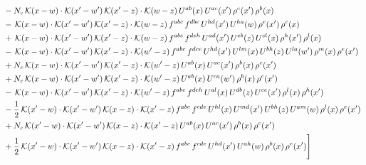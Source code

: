 \documentclass[9pt]{article}
\numberwithin{equation}{section}
\begin{document}
\begin{align}
& -N_{c}\,\mathcal{K}(x-w)\cdot\mathcal{K}(x'-w')\,\mathcal{K}(x'-z)\cdot\mathcal{K}(w-z)\,U^{ab}(x)\,U^{ac}(x')\,\rho^{c}(x')\,\rho^{b}(x)\notag\\
& -\,\mathcal{K}(x-w)\cdot\mathcal{K}(x'-w')\,\mathcal{K}(x'-z)\cdot\mathcal{K}(w-z)\,f^{abc}\,f^{dbe}\,U^{hd}(x')\,U^{ha}(w)\,\rho^{e}(x')\,\rho^{c}(x)\notag\\
& +\,\mathcal{K}(x-w)\cdot\mathcal{K}(x'-w')\,\mathcal{K}(x'-z)\cdot\mathcal{K}(w-z)\,f^{abc}\,f^{deh}\,U^{ad}(x')\,U^{eb}(z)\,U^{cl}(x)\,\rho^{h}(x')\,\rho^{l}(x)\notag\\
& -\,\mathcal{K}(x-w)\cdot\mathcal{K}(x'-w')\,\mathcal{K}(x'-z)\cdot\mathcal{K}(w'-z)\,f^{abc}\,f^{dce}\,U^{hd}(x')\,U^{lm}(x)\,U^{bh}(z)\,U^{la}(w')\,\rho^{m}(x)\,\rho^{e}(x')\notag\\
& +N_{c}\,\mathcal{K}(x-w)\cdot\mathcal{K}(x'-w')\,\mathcal{K}(x'-z)\cdot\mathcal{K}(w'-z)\,U^{ab}(x)\,U^{ac}(x')\,\rho^{b}(x)\,\rho^{c}(x')\notag\\
& +N_{c}\,\mathcal{K}(x-w)\cdot\mathcal{K}(x'-w')\,\mathcal{K}(x'-z)\cdot\mathcal{K}(w'-z)\,U^{ab}(x)\,U^{ca}(w')\,\rho^{b}(x)\,\rho^{c}(x')\notag\\
& -\,\mathcal{K}(x-w)\cdot\mathcal{K}(x'-w')\,\mathcal{K}(x'-z)\cdot\mathcal{K}(w'-z)\,f^{abc}\,f^{deh}\,U^{al}(x)\,U^{db}(z)\,U^{ce}(x')\,\rho^{l}(x)\,\rho^{h}(x')\notag\\
& -\frac{1}{2}\,\mathcal{K}(x'-w)\cdot\mathcal{K}(x'-w')\,\mathcal{K}(x-z)\cdot\mathcal{K}(x'-z)\,f^{abc}\,f^{cde}\,U^{hl}(x)\,U^{md}(x')\,U^{bh}(z)\,U^{am}(w)\,\rho^{l}(x)\,\rho^{e}(x')\notag\\
& +N_{c}\,\mathcal{K}(x'-w)\cdot\mathcal{K}(x'-w')\,\mathcal{K}(x-z)\cdot\mathcal{K}(x'-z)\,U^{ab}(x)\,U^{ac}(x')\,\rho^{b}(x)\,\rho^{c}(x')\notag\\
& +\frac{1}{2}\,\mathcal{K}(x'-w)\cdot\mathcal{K}(x'-w')\,\mathcal{K}(x-z)\cdot\mathcal{K}(x'-z)\,f^{abc}\,f^{cde}\,U^{hd}(x')\,U^{ah}(w)\,\rho^{b}(x)\,\rho^{e}(x')\Bigg]
\end{align}
\end{document}
